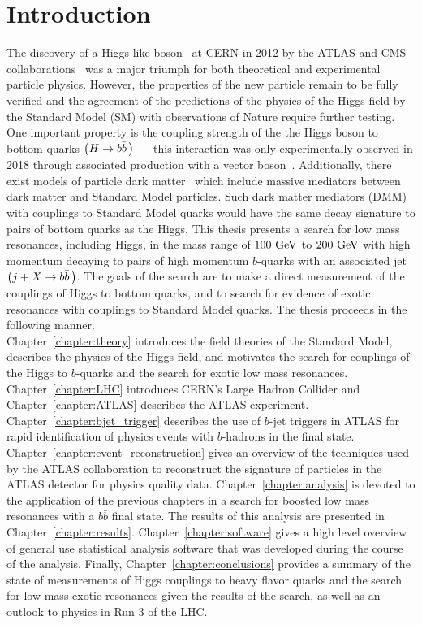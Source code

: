 \chapter{Introduction}\label{chapter:introduction}

The discovery of a Higgs-like boson~\cite{Higgs:1964ia,Higgs:1964pj,Higgs:1966ev,Englert:1964et,Guralnik:1964eu} at CERN in 2012 by the \Gls{ATLAS} and CMS collaborations~\cite{Aad:2012tfa,Chatrchyan:2012xdj} was a major triumph for both theoretical and experimental particle physics.
However, the properties of the new particle remain to be fully verified and the agreement of the predictions of the physics of the Higgs field by the \Gls{Standard Model} (SM) with observations of Nature require further testing.
One important property is the coupling strength of the the Higgs boson to bottom quarks $\left(H \to b\bar{b}\,\right)$ --- this interaction was only experimentally observed in 2018 through associated production with a vector boson~\cite{Aaboud:2018zhk,CMS:2018abb}.
Additionally, there exist models of particle dark matter~\cite{Abdallah:2015ter} which include massive mediators between dark matter and Standard Model particles.
Such dark matter mediators (\Gls{DMM}) with couplings to Standard Model quarks would have the same decay signature to pairs of bottom quarks as the Higgs.
This thesis presents a search for low mass resonances, including Higgs, in the mass range of $100~\mathrm{GeV}$ to $200~\mathrm{GeV}$ with high momentum decaying to pairs of high momentum $b$-quarks with an associated jet $\left(j + X \to b\bar{b}\,\right)$.
The goals of the search are to make a direct measurement of the couplings of Higgs to bottom quarks, and to search for evidence of exotic resonances with couplings to Standard Model quarks.
The thesis proceeds in the following manner.\\

Chapter~\ref{chapter:theory} introduces the field theories of the Standard Model, describes the physics of the Higgs field, and motivates the search for couplings of the Higgs to $b$-quarks and the search for exotic low mass resonances.
Chapter~\ref{chapter:LHC} introduces CERN's Large Hadron Collider and Chapter~\ref{chapter:ATLAS} describes the ATLAS experiment.
Chapter~\ref{chapter:bjet_trigger} describes the use of $b$-jet triggers in ATLAS for rapid identification of physics events with $b$-hadrons in the final state.
Chapter~\ref{chapter:event_reconstruction} gives an overview of the techniques used by the ATLAS collaboration to reconstruct the signature of particles in the ATLAS detector for physics quality data.
Chapter~\ref{chapter:analysis} is devoted to the application of the previous chapters in a search for boosted low mass resonances with a $b\bar{b}$ final state.
The results of this analysis are presented in Chapter~\ref{chapter:results}.
Chapter~\ref{chapter:software} gives a high level overview of general use statistical analysis software that was developed during the course of the analysis.
Finally, Chapter~\ref{chapter:conclusions} provides a summary of the state of measurements of Higgs couplings to heavy flavor quarks and the search for low mass exotic resonances given the results of the search, as well as an outlook to physics in Run 3 of the LHC.
